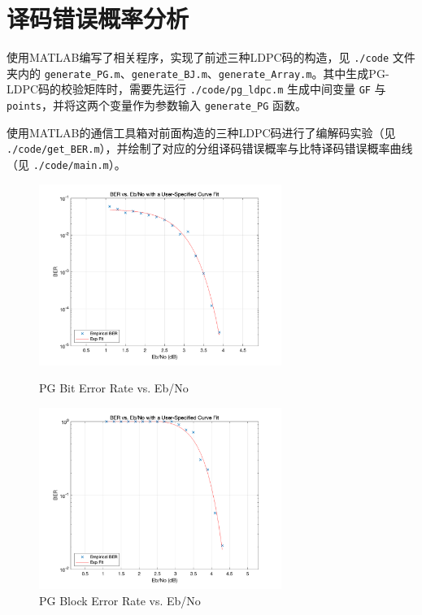 \documentclass[lang=cn,11pt,a4paper,numbers]{elegantpaper}
\begin{document}
\section{译码错误概率分析}

使用MATLAB编写了相关程序，实现了前述三种LDPC码的构造，见 \lstinline{./code} 文件夹内的 \lstinline{generate_PG.m}、\lstinline{generate_BJ.m}、\lstinline{generate_Array.m}。其中生成PG-LDPC码的校验矩阵时，需要先运行 \lstinline{./code/pg_ldpc.m} 生成中间变量 \lstinline{GF} 与 \lstinline{points}，并将这两个变量作为参数输入 \lstinline{generate_PG} 函数。

使用MATLAB的通信工具箱对前面构造的三种LDPC码进行了编解码实验（见 \lstinline{./code/get_BER.m}），并绘制了对应的分组译码错误概率与比特译码错误概率曲线（见 \lstinline{./code/main.m}）。

\begin{figure}[htbp]
\begin{minipage}[t]{0.5\linewidth}
\centering
\includegraphics[width=3.1in]{figure/pg_bit_er.png}
\caption{PG Bit Error Rate vs. Eb/No}
\label{fig:pg_bit_er}
\end{minipage}%
\begin{minipage}[t]{0.5\linewidth}
\centering
\includegraphics[width=3.1in]{figure/pg_block_er.png}
\caption{PG Block Error Rate vs. Eb/No}
\label{fig:pg_block_er}
\end{minipage}
\end{figure}
\end{document}
